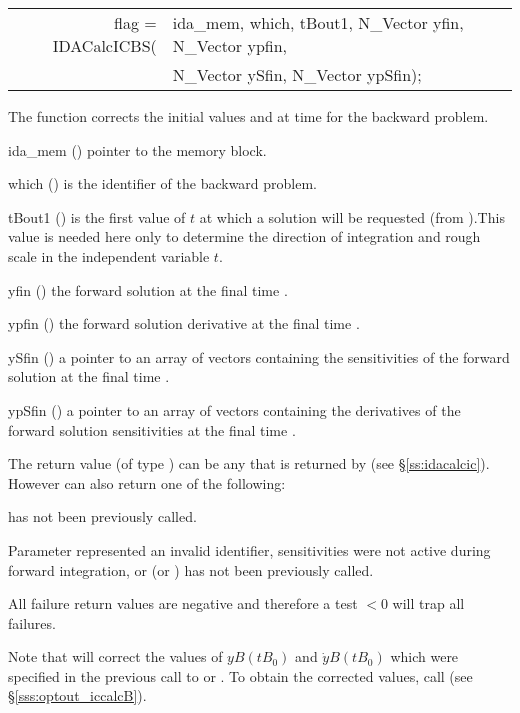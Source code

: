 {
  \begin{tabular}[t]{@{}r@{}l@{}}
  flag = IDACalcICBS(&ida\_mem, which, tBout1, N\_Vector yfin, N\_Vector ypfin, \\
                     &N\_Vector ySfin, N\_Vector ypSfin);
  \end{tabular}
}
{
  The function  corrects the initial values  and  at
  time  for the backward problem.
}
{
  \begin{args}
  \item[ida\_mem] ()
    pointer to the {\idas} memory block.
  \item[which] ()
    is the identifier of the backward problem.
  \item[tBout1] ()
    is the first value of $t$ at which a solution will be requested (from
    ).This value is needed here only to determine the direction of
    integration and rough scale in the independent variable $t$.   
  \item[yfin] ()
    the forward solution at the final time .
  \item[ypfin] ()
    the forward solution derivative at the final time .
  \item[ySfin]  ()
    a pointer to an array of  vectors containing the sensitivities of
    the forward solution at the final time .
  \item[ypSfin]  ()
    a pointer to an array of  vectors containing the derivatives of
    the forward solution sensitivities at the final time .

  \end{args}
}
{
  The return value  (of type ) can be any that is returned by 
   (see \S\ref{ss:idacalcic}). However  can also 
  return one of the following:

  \begin{args}
  \item[\Id{IDA\_NO\_ADJ}]
     has not been previously called.
  \item[\id{IDA\_ILL\_INPUT}]
    Parameter  represented an invalid identifier, sensitivities were
    not active during forward integration, or  (or )
    has not been previously called.
  \end{args} 
}
{
  All failure return values are negative and therefore a test  $< 0$
  will trap all  failures.

  Note that  will correct the values of $yB(tB_0)$ and 
  $\dot{y}B(tB_0)$ which were specified in the previous call to  
  or . To obtain the corrected values, call 
   (see \S\ref{sss:optout_iccalcB}).
}



